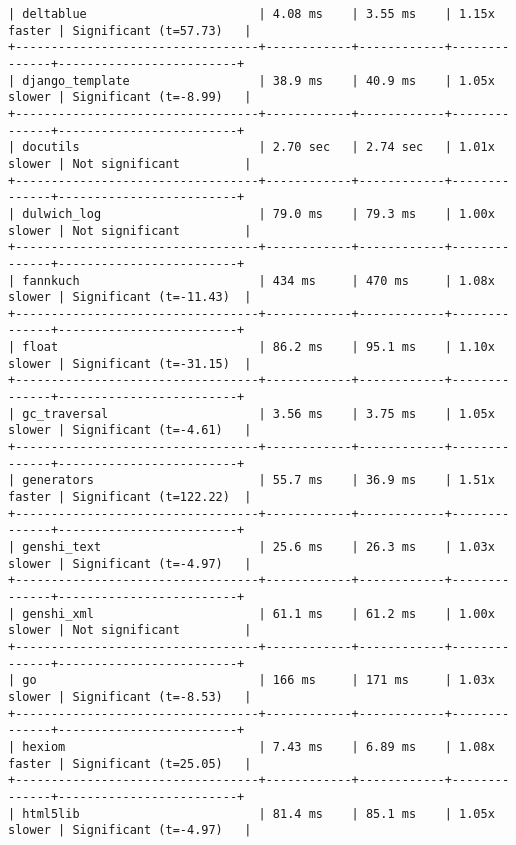 \begin{code}
\begin{verbatim}
| deltablue                        | 4.08 ms    | 3.55 ms    | 1.15x faster | Significant (t=57.73)   |
+----------------------------------+------------+------------+--------------+-------------------------+
| django_template                  | 38.9 ms    | 40.9 ms    | 1.05x slower | Significant (t=-8.99)   |
+----------------------------------+------------+------------+--------------+-------------------------+
| docutils                         | 2.70 sec   | 2.74 sec   | 1.01x slower | Not significant         |
+----------------------------------+------------+------------+--------------+-------------------------+
| dulwich_log                      | 79.0 ms    | 79.3 ms    | 1.00x slower | Not significant         |
+----------------------------------+------------+------------+--------------+-------------------------+
| fannkuch                         | 434 ms     | 470 ms     | 1.08x slower | Significant (t=-11.43)  |
+----------------------------------+------------+------------+--------------+-------------------------+
| float                            | 86.2 ms    | 95.1 ms    | 1.10x slower | Significant (t=-31.15)  |
+----------------------------------+------------+------------+--------------+-------------------------+
| gc_traversal                     | 3.56 ms    | 3.75 ms    | 1.05x slower | Significant (t=-4.61)   |
+----------------------------------+------------+------------+--------------+-------------------------+
| generators                       | 55.7 ms    | 36.9 ms    | 1.51x faster | Significant (t=122.22)  |
+----------------------------------+------------+------------+--------------+-------------------------+
| genshi_text                      | 25.6 ms    | 26.3 ms    | 1.03x slower | Significant (t=-4.97)   |
+----------------------------------+------------+------------+--------------+-------------------------+
| genshi_xml                       | 61.1 ms    | 61.2 ms    | 1.00x slower | Not significant         |
+----------------------------------+------------+------------+--------------+-------------------------+
| go                               | 166 ms     | 171 ms     | 1.03x slower | Significant (t=-8.53)   |
+----------------------------------+------------+------------+--------------+-------------------------+
| hexiom                           | 7.43 ms    | 6.89 ms    | 1.08x faster | Significant (t=25.05)   |
+----------------------------------+------------+------------+--------------+-------------------------+
| html5lib                         | 81.4 ms    | 85.1 ms    | 1.05x slower | Significant (t=-4.97)   |

\end{verbatim}
\end{code}
